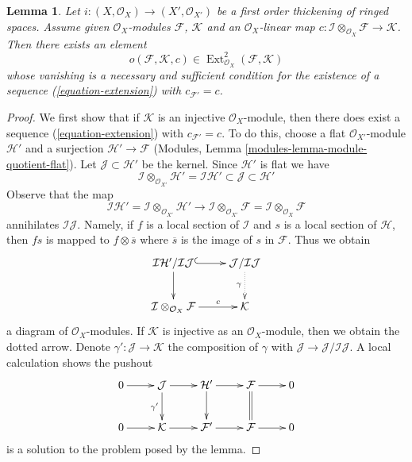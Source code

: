 \documentclass[10pt,a4paper]{amsart}
\theoremstyle{plain}
\newtheorem{lemma}[subsection]{Lemma}
\theoremstyle{definition}
\theoremstyle{remark}
\numberwithin{equation}{subsection}
\def\Ext{\mathop{\mathrm{Ext}}\nolimits}
\begin{document}
\begin{lemma}
\label{lemma-inf-obs-ext}
Let $i : (X, \mathcal{O}_X) \to (X', \mathcal{O}_{X'})$
be a first order thickening of ringed spaces. Assume given
$\mathcal{O}_X$-modules $\mathcal{F}$, $\mathcal{K}$
and an $\mathcal{O}_X$-linear map
$c : \mathcal{I} \otimes_{\mathcal{O}_X} \mathcal{F} \to \mathcal{K}$.
Then there exists an element
$$
o(\mathcal{F}, \mathcal{K}, c) \in
\Ext^2_{\mathcal{O}_X}(\mathcal{F}, \mathcal{K})
$$
whose vanishing is a necessary and sufficient condition for the existence
of a sequence (\ref{equation-extension}) with $c_{\mathcal{F}'} = c$.
\end{lemma}

\begin{proof}
We first show that if $\mathcal{K}$ is an injective $\mathcal{O}_X$-module,
then there does exist a sequence (\ref{equation-extension}) with
$c_{\mathcal{F}'} = c$. To do this, choose a flat
$\mathcal{O}_{X'}$-module $\mathcal{H}'$ and a surjection
$\mathcal{H}' \to \mathcal{F}$
(Modules, Lemma \ref{modules-lemma-module-quotient-flat}).
Let $\mathcal{J} \subset \mathcal{H}'$ be the kernel. Since $\mathcal{H}'$
is flat we have
$$
\mathcal{I} \otimes_{\mathcal{O}_{X'}} \mathcal{H}' =
\mathcal{I}\mathcal{H}'
\subset \mathcal{J} \subset \mathcal{H}'
$$
Observe that the map
$$
\mathcal{I}\mathcal{H}' =
\mathcal{I} \otimes_{\mathcal{O}_{X'}} \mathcal{H}'
\longrightarrow
\mathcal{I} \otimes_{\mathcal{O}_{X'}} \mathcal{F} =
\mathcal{I} \otimes_{\mathcal{O}_X} \mathcal{F}
$$
annihilates $\mathcal{I}\mathcal{J}$. Namely, if $f$ is a local section
of $\mathcal{I}$ and $s$ is a local section of $\mathcal{H}$, then
$fs$ is mapped to $f \otimes \overline{s}$ where $\overline{s}$ is
the image of $s$ in $\mathcal{F}$. Thus we obtain
$$
\xymatrix{
\mathcal{I}\mathcal{H}'/\mathcal{I}\mathcal{J}
\ar@{^{(}->}[r] \ar[d] &
\mathcal{J}/\mathcal{I}\mathcal{J} \ar@{..>}[d]_\gamma \\
\mathcal{I} \otimes_{\mathcal{O}_X} \mathcal{F} \ar[r]^-c &
\mathcal{K}
}
$$
a diagram of $\mathcal{O}_X$-modules. If $\mathcal{K}$ is injective
as an $\mathcal{O}_X$-module, then we obtain the dotted arrow.
Denote $\gamma' : \mathcal{J} \to \mathcal{K}$ the composition
of $\gamma$ with $\mathcal{J} \to \mathcal{J}/\mathcal{I}\mathcal{J}$.
A local calculation shows the pushout
$$
\xymatrix{
0 \ar[r] &
\mathcal{J} \ar[r] \ar[d]_{\gamma'} &
\mathcal{H}' \ar[r] \ar[d] &
\mathcal{F} \ar[r] \ar@{=}[d] &
0 \\
0 \ar[r] &
\mathcal{K} \ar[r] &
\mathcal{F}' \ar[r] &
\mathcal{F} \ar[r] &
0
}
$$
is a solution to the problem posed by the lemma.


\end{proof}
\end{document}
